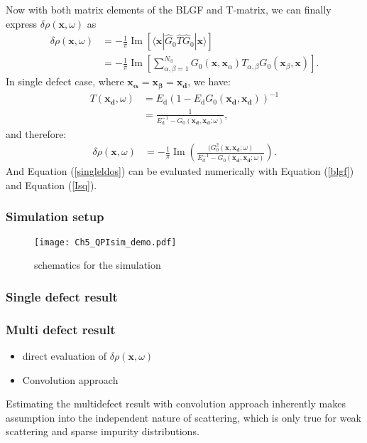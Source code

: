 Now with both matrix elements of the \ac{BLGF} and T-matrix, we can finally express $\delta\rho(\mathbf{x},\omega)$ as 
\begin{align}
	\delta\rho(\mathbf{x},\omega) &= - \frac{1}{\pi} \operatorname{Im} \left[ \langle \mathbf{x} | \hat{G}_0 \hat{T} \hat{G}_0 | \mathbf{x} \rangle \right] \\
	&= -\frac{1}{\pi} \operatorname{Im} \left[\sum_{\alpha, \beta=1}^{N_{\text{d}}} G_0(\mathbf{x}, \mathbf{x}_\alpha) T_{\alpha, \beta} G_0(\mathbf{x}_\beta, \mathbf{x})\right].
\end{align}
In single defect case, where $\mathbf{x_\alpha} = \mathbf{x_\beta} = \mathbf{x_d}$, we have: 
\begin{align}
	T(\mathbf{x_d},\omega) &= E_{\text{d}} \left( 1 - E_{\text{d}} G_0(\mathbf{x_d}, \mathbf{x_d}) \right)^{-1} \label{T_matrix_ele} \\
	&= \frac{1}{E_{\text{d}}^{-1} - G_0(\mathbf{x_d}, \mathbf{x_d}; \omega)},
\end{align}
and therefore: 
\begin{align}
	\delta\rho(\mathbf{x},\omega) &= - \frac{1}{\pi} \operatorname{Im}(\frac{(G_0^2(\mathbf{x},\mathbf{x_d};\omega)}{E_d^{-1} - G_0(\mathbf{x_d},\mathbf{x_d};\omega)}) \label{singleldos}. 
\end{align}
And Equation (\ref{singleldos}) can be evaluated numerically with Equation (\ref{blgf}) and Equation (\ref{Isq}).

\subsubsection{Simulation setup}
\begin{figure}
	\centering
	\texttt{[image: Ch5\_QPIsim\_demo.pdf]}
	\caption{schematics for the simulation}
	\label{fig:ch5_qpisim_demo}
\end{figure}
\subsubsection{Single defect result}

\subsubsection{Multi defect result}
\begin{itemize}
	\item direct evaluation of $\delta\rho(\mathbf{x},\omega)$
	\item Convolution approach
\end{itemize} 
Estimating the multidefect result with convolution approach inherently makes assumption into the independent nature of scattering, which is only true for weak scattering and sparse impurity distributions. 

